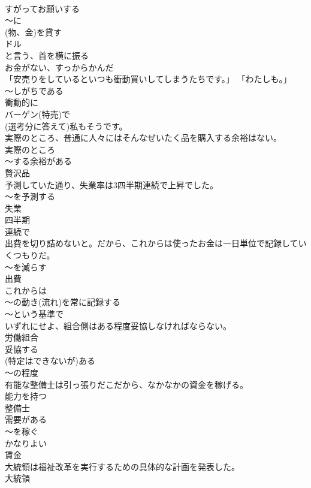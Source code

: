 \documentclass[8pt]{extreport}
\begin{document}
\begin{CJK}{UTF8}{min}
\\	すがってお願いする 
\\	～に
\\	(物、金)を貸す 
\\	ドル 
\\	と言う、首を横に振る 
\\	お金がない、すっからかんだ
\\	「安売りをしているといつも衝動買いしてしまうたちです。」 「わたしも。」	
\\	～しがちである 
\\	衝動的に 
\\	バーゲン(特売)で 
\\	(選考分に答えて)私もそうです。
\\	実際のところ、普通に人々にはそんなぜいたく品を購入する余裕はない。	
\\	実際のところ 
\\	～する余裕がある 
\\	贅沢品
\\	予測していた通り、失業率は3四半期連続で上昇でした。	
\\	～を予測する 
\\	失業 
\\	四半期 
\\	連続で
\\	出費を切り詰めないと。だから、これからは使ったお金は一日単位で記録していくつもりだ。	
\\	～を減らす 
\\	出費 
\\	これからは 
\\	～の動き(流れ)を常に記録する 
\\	～という基準で
\\	いずれにせよ、組合側はある程度妥協しなければならない。	
\\	労働組合 
\\	妥協する 
\\	(特定はできないが)ある 
\\	～の程度
\\	有能な整備士は引っ張りだこだから、なかなかの資金を稼げる。	
\\	能力を持つ 
\\	整備士 
\\	需要がある 
\\	～を稼ぐ 
\\	かなりよい 
\\	賃金
\\	大統領は福祉改革を実行するための具体的な計画を発表した。	
\\	大統領 

\end{CJK}
\end{document}
